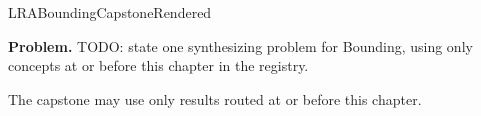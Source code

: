 \ifcsname LRABoundingCapstoneRendered\endcsname
\else
\expandafter\gdef\csname LRABoundingCapstoneRendered\endcsname{}

\newpage
{}
\label{cap:bounding}

\begin{tcolorbox}[
  colback=gray!6,
  colframe=gray!40,
  arc=2pt,
  left=8pt, right=8pt, top=6pt, bottom=6pt,
  title={\small\textbf{Capstone Problem}},
  fonttitle=\small\bfseries
]
\textbf{Problem.}
TODO: state one synthesizing problem for Bounding, using only concepts at or
before this chapter in the registry.
\end{tcolorbox}

\begin{remark*}
The capstone may use only results routed at or before this chapter.
\end{remark*}

\clearpage
\fi
